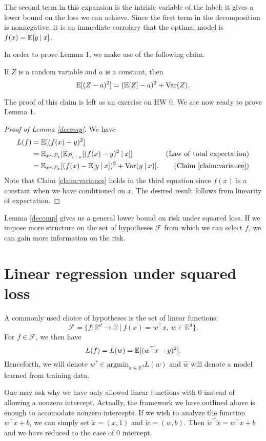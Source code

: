 The second term in this expansion is the intrisic variable of the label; it gives a lower bound on the loss we can achieve. Since the first term in the decomposition is nonnegative, it is an immediate corrolary that the optimal model is $f(x) = \mathbb{E}[y \: | \: x]$.

In order to prove Lemma 1, we make use of the following claim.
\begin{center}
    If $Z$ is a random variable and $a$ is a constant, then $$\mathbb{E}[(Z-a)^2] = (\mathbb{E}[Z]-a)^2 + \mathrm{Var}(Z).$$
\end{center}


The proof of this claim is left as an exercise on HW 0. We are now ready to prove Lemma 1.
\begin{proof}[Proof of Lemma \ref{decomp}]
We have
\begin{align*}
    L(f) &= \mathbb{E}[(f(x)-y)^2] \\
    &= \mathbb{E}_{x\sim P_x}[\mathbb{E}_{P_{y \; | \;x}}[(f(x)-y)^2\: | \: x]] & \mathrm{(Law~{} of~{} total~{} expectation)} \\
    &= \mathbb{E}_{x\sim P_x}[(f(x)-\mathbb{E}[y \: | \: x])^2 + \mathrm{Var}(y \: | \: x)]. & \mathrm{(Claim~{} \ref{claim:variance})}
\end{align*}
Note that Claim \ref{claim:variance} holds in the third equation since $f(x)$ is a constant when we have conditioned on $x$. The desired result follows from linearity of expectation.
\end{proof}
Lemma \ref{decomp} gives us a general lower bound on risk under squared loss. If we impose more structure on the set of hypotheses $\mathcal{F}$ from which we can select $f$, we can gain more information on the risk.

\section{Linear regression under squared loss}
A commonly used choice of hypotheses is the set of linear functions: $$\mathcal{F} = \{f: \mathbb{R}^d \rightarrow \mathbb{R} \: | \: f(x) = w^\top x, \: w\in \mathbb{R}^d\}.$$ For $f\in\mathcal{F}$, we then have $$L(f) = L(w) = \mathbb{E}[(w^\top x-y)^2].$$ Henceforth, we will denote $w^* \in \mathrm{argmin}_{w\in\mathbb{R}^d} L(w)$ and $\hat{w}$ will denote a model learned from training data.

One may ask why we have only allowed linear functions with $0$ instead of allowing a nonzero intercept. Actually, the framework we have outlined above is enough to accomodate nonzero intercepts. If we wish to analyze the function $w^\top x + b$, we can simply set $\tilde{x} = (x,1)$ and $\tilde{w} = (w,b)$. Then $\tilde{w}^\top \tilde{x} = w^\top x + b$ and we have reduced to the case of $0$ intercept.

